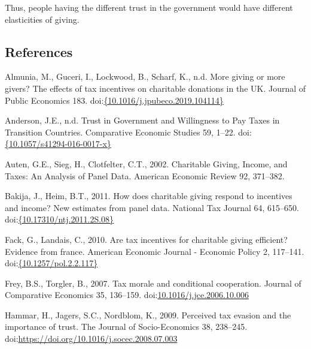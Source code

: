 \documentclass[ review  , 3p ]{elsarticle}
\begin{document}
  Thus, people having the different trust in the government would have different elasticities of giving.
  
  \clearpage
  
  \hypertarget{references}{%
  \subsection*{References}\label{references}}
  
  \hypertarget{refs}{}
  \leavevmode\hypertarget{ref-Almunia2020}{}%
  Almunia, M., Guceri, I., Lockwood, B., Scharf, K., n.d. More giving or more givers? The effects of tax incentives on charitable donations in the UK. Journal of Public Economics 183. doi:\href{https://doi.org/\%7B10.1016/j.jpubeco.2019.104114\%7D}{\{10.1016/j.jpubeco.2019.104114\}}
  
  \leavevmode\hypertarget{ref-Anderson2017}{}%
  Anderson, J.E., n.d. Trust in Government and Willingness to Pay Taxes in Transition Countries. Comparative Economic Studies 59, 1--22. doi:\href{https://doi.org/\%7B10.1057/s41294-016-0017-x\%7D}{\{10.1057/s41294-016-0017-x\}}
  
  \leavevmode\hypertarget{ref-Auten2002}{}%
  Auten, G.E., Sieg, H., Clotfelter, C.T., 2002. Charitable Giving, Income, and Taxes: An Analysis of Panel Data. American Economic Review 92, 371--382.
  
  \leavevmode\hypertarget{ref-Bakija2011}{}%
  Bakija, J., Heim, B.T., 2011. How does charitable giving respond to incentives and income? New estimates from panel data. National Tax Journal 64, 615--650. doi:\href{https://doi.org/\%7B10.17310/ntj.2011.2S.08\%7D}{\{10.17310/ntj.2011.2S.08\}}
  
  \leavevmode\hypertarget{ref-Fack2010}{}%
  Fack, G., Landais, C., 2010. Are tax incentives for charitable giving efficient? Evidence from france. American Economic Journal - Economic Policy 2, 117--141. doi:\href{https://doi.org/\%7B10.1257/pol.2.2.117\%7D}{\{10.1257/pol.2.2.117\}}
  
  \leavevmode\hypertarget{ref-Frey2007}{}%
  Frey, B.S., Torgler, B., 2007. Tax morale and conditional cooperation. Journal of Comparative Economics 35, 136--159. doi:\href{https://doi.org/10.1016/j.jce.2006.10.006}{10.1016/j.jce.2006.10.006}
  
  \leavevmode\hypertarget{ref-Hammar2009}{}%
  Hammar, H., Jagers, S.C., Nordblom, K., 2009. Perceived tax evasion and the importance of trust. The Journal of Socio-Economics 38, 238--245. doi:\href{https://doi.org/https://doi.org/10.1016/j.socec.2008.07.003}{https://doi.org/10.1016/j.socec.2008.07.003}
  
\end{document}
